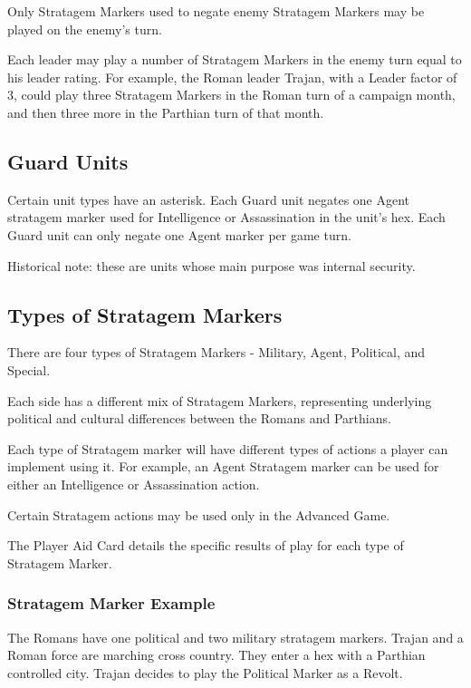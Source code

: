 Only Stratagem Markers used to negate enemy Stratagem Markers may be played on the enemy's turn.

Each leader may play a number of Stratagem Markers in the enemy turn equal to his leader rating. For example, the Roman leader Trajan, with a Leader factor of 3, could play three Stratagem Markers in the Roman turn of a campaign month, and then three more in the Parthian turn of that month.

\subsection{Guard Units}

Certain unit types have an asterisk. Each Guard unit negates one Agent stratagem marker used for Intelligence or Assassination in the unit’s hex. Each Guard unit can only negate one Agent marker per game turn.

Historical note: these are units whose main purpose was internal security.

\subsection{Types of Stratagem Markers}

There are four types of Stratagem Markers - Military, Agent, Political, and Special.

Each side has a different mix of Stratagem Markers, representing underlying political and cultural differences between the Romans and Parthians.

Each type of Stratagem marker will have different types of actions a player can implement using it. For example, an Agent Stratagem marker can be used for either an Intelligence or Assassination action.

Certain Stratagem actions may be used only in the Advanced Game.

The Player Aid Card details the specific results of play for each type of Stratagem Marker.

\subsubsection{Stratagem Marker Example}

The Romans have one political and two military stratagem markers. Trajan and a Roman force are marching cross country. They enter a hex with a Parthian controlled city. Trajan decides to play the Political Marker as a Revolt.

